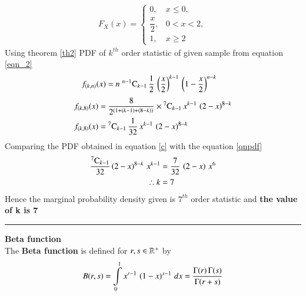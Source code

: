 \documentclass[journal,12pt,twocolumn]{IEEEtran}
\begin{document}
 \begin{align}
 F_{X}(x) = 
 \begin{cases}
      0,             &x \leq 0, \\ 
  \dfrac{x}{2},      &0 < x< 2, \\ 
     1,              & x\geq2
 \end{cases} \label{e}
 \end{align}
Using theorem \eqref{th2} PDF of $k^{th}$ order statistic of given sample from equation \eqref{eqn_2}
\begin{align}
f_{(k,n)}(x) &= n\;{}^{n-1}\mathrm{C}_{k-1}\,\dfrac{1}{2}\,\left(\dfrac{x}{2}\right)^{k-1}\,\left(1-\dfrac{x}{2}\right)^{n-k} 
\end{align}
\begin{align}
f_{(k,8)}(x) &= \dfrac{8}{2^{(1+(k-1)+(8-k))}}\times{}^{7}\mathrm{C}_{k-1}\,x^{k-1}\,\left(2-x\right)^{8-k}\\
f_{(k,8)}(x) &= {}^{7}\mathrm{C}_{k-1}\,\dfrac{1}{32}\,x^{k-1}\,\left(2-x\right)^{8-k} \label{c}
 \end{align}
Comparing the PDF obtained in equation \eqref{c} with the equation \eqref{qnpdf}
\begin{align}
\dfrac{{}^{7}\mathrm{C}_{k-1}}{32}\left(2-x\right)^{8-k}\,x^{k-1} &= \dfrac{7}{32}\,\left(2-x\right)\,x^6 \\
\therefore k &= 7 
\end{align}
Hence the marginal probability density given is $7^{th}$ order statistic and 
\textbf{the value of k is 7} 
\vspace{0.5cm}
\hrule
\vspace{0.5cm}
\begin{definition}
\textbf{Beta function}\\
\label{def2}
 The \textbf{Beta function} is defined for $r, s \in \mathbb{R}^{+}$ by 
\begin{equation}
B(r,s) = \int\limits_{0}^{1} x^{r-1}\,\left(1-x\right)^{s-1}\,dx = \dfrac{\Gamma(r)\,\Gamma(s)}{\Gamma(r+s)} 
\label{eqn_5}
\end{equation}
\end{definition}
\end{document}
